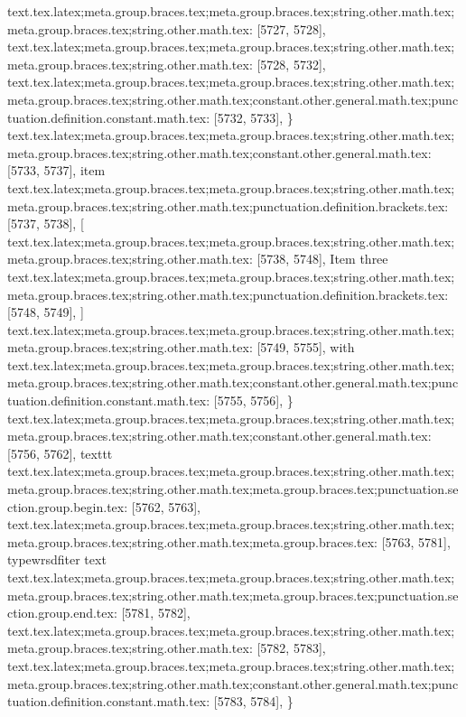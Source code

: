 {{{{{{{{{{{{{{{{{{{{{{{{{{{{{{{{{{{{{{{{{{{{{{{{{{{{{{{{{{{{{{{{{{{{{{{{{{{{{{{{{{{{{{{{{{{{{{{{{{{{{{{{{{{{{{{{{{{{{{{{{{{{{{{{{{{{{{{{{{{{{{{{{{{{{{{{{{{{{text.tex.latex;meta.group.braces.tex;meta.group.braces.tex;string.other.math.tex;meta.group.braces.tex;string.other.math.tex: [5727, 5728], {
}
text.tex.latex;meta.group.braces.tex;meta.group.braces.tex;string.other.math.tex;meta.group.braces.tex;string.other.math.tex: [5728, 5732], {    }
text.tex.latex;meta.group.braces.tex;meta.group.braces.tex;string.other.math.tex;meta.group.braces.tex;string.other.math.tex;constant.other.general.math.tex;punctuation.definition.constant.math.tex: [5732, 5733], {\}
text.tex.latex;meta.group.braces.tex;meta.group.braces.tex;string.other.math.tex;meta.group.braces.tex;string.other.math.tex;constant.other.general.math.tex: [5733, 5737], {item}
text.tex.latex;meta.group.braces.tex;meta.group.braces.tex;string.other.math.tex;meta.group.braces.tex;string.other.math.tex;punctuation.definition.brackets.tex: [5737, 5738], {[}
text.tex.latex;meta.group.braces.tex;meta.group.braces.tex;string.other.math.tex;meta.group.braces.tex;string.other.math.tex: [5738, 5748], {Item three}
text.tex.latex;meta.group.braces.tex;meta.group.braces.tex;string.other.math.tex;meta.group.braces.tex;string.other.math.tex;punctuation.definition.brackets.tex: [5748, 5749], {]}
text.tex.latex;meta.group.braces.tex;meta.group.braces.tex;string.other.math.tex;meta.group.braces.tex;string.other.math.tex: [5749, 5755], { with }
text.tex.latex;meta.group.braces.tex;meta.group.braces.tex;string.other.math.tex;meta.group.braces.tex;string.other.math.tex;constant.other.general.math.tex;punctuation.definition.constant.math.tex: [5755, 5756], {\}
text.tex.latex;meta.group.braces.tex;meta.group.braces.tex;string.other.math.tex;meta.group.braces.tex;string.other.math.tex;constant.other.general.math.tex: [5756, 5762], {texttt}
text.tex.latex;meta.group.braces.tex;meta.group.braces.tex;string.other.math.tex;meta.group.braces.tex;string.other.math.tex;meta.group.braces.tex;punctuation.section.group.begin.tex: [5762, 5763], {{}
text.tex.latex;meta.group.braces.tex;meta.group.braces.tex;string.other.math.tex;meta.group.braces.tex;string.other.math.tex;meta.group.braces.tex: [5763, 5781], {typewrsdfiter text}
text.tex.latex;meta.group.braces.tex;meta.group.braces.tex;string.other.math.tex;meta.group.braces.tex;string.other.math.tex;meta.group.braces.tex;punctuation.section.group.end.tex: [5781, 5782], {}}
text.tex.latex;meta.group.braces.tex;meta.group.braces.tex;string.other.math.tex;meta.group.braces.tex;string.other.math.tex: [5782, 5783], {
}
text.tex.latex;meta.group.braces.tex;meta.group.braces.tex;string.other.math.tex;meta.group.braces.tex;string.other.math.tex;constant.other.general.math.tex;punctuation.definition.constant.math.tex: [5783, 5784], {\}
}}}}}}}}}}}}}}}}}}}}}}}}}}}}}}}}}}}}}}}}}}}}}}}}}}}}}}}}}}}}}}}}}}}}}}}}}}}}}}}}}}}}}}}}}}}}}}}}}}}}}}}}}}}}}}}}}}}}}}}}}}}}}}}}}}}}}}}}}}}}}}}}}}}}}}}}}}}}}}}}
